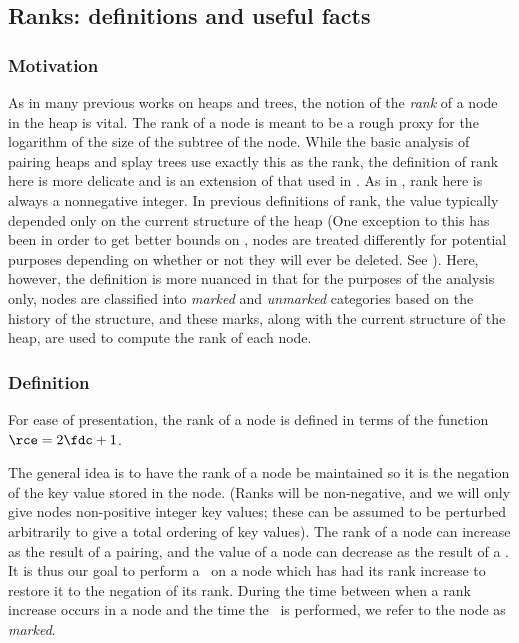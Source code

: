 \subsection{Ranks: definitions and useful facts} 

\subsubsection{Motivation}

As in many previous works on heaps and trees, the notion of the \emph{rank} of a node in the heap is vital. The rank of a node is meant to be a rough proxy for the logarithm of the size of the subtree of the node. While the basic analysis of pairing heaps and splay trees \cite{DBLP:journals/algorithmica/FredmanSST86,DBLP:journals/jacm/SleatorT85} use exactly this as the rank, the definition of rank here is more delicate and is an extension of that used in \cite{DBLP:journals/jacm/Fredman99}. As in \cite{DBLP:journals/jacm/Fredman99}, rank here is always a nonnegative integer. In previous definitions of rank, the value typically depended only on the current structure of the heap (One exception to this has been in order to get better bounds on \opIns, nodes are treated differently for potential purposes depending on whether or not they will ever be deleted. See \cite{DBLP:journals/cacm/StaskoV87,DBLP:journals/corr/abs-1110-4428,DBLP:conf/swat/Iacono00}). Here, however, the definition is more nuanced in that for the purposes of the analysis only, nodes are classified into \emph{marked} and \emph{unmarked} categories based on the history of the structure, and these marks, along with the current structure of the heap, are used to compute the rank of each node. 


\subsubsection{Definition} 



For ease of presentation, the rank of a node is defined in terms of the function $\rce=2\fdc+1$.
\begin{fullonly}

\end{fullonly}
The general idea is to have the rank of a node be maintained so it is the negation of the key value stored in the node. (Ranks will be non-negative, and we will only give nodes non-positive integer key values; these can be assumed to be perturbed arbitrarily to give a total ordering of key values). The rank of a node can increase as the result of a pairing, and the value of a node can decrease as the result of a \opDc. It is thus our goal to perform a \opDc\ on a node which has had its rank increase to restore it to the negation of its rank. During the time between when a rank increase occurs in a node and the time the \opDc\ is performed, we refer to the node as \emph{marked}. 

